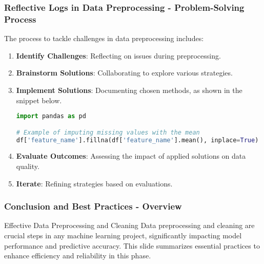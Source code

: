 \documentclass[aspectratio=169]{beamer}
\begin{document}
\begin{frame}[fragile]
    \frametitle{Reflective Logs in Data Preprocessing - Problem-Solving Process}
    
    The process to tackle challenges in data preprocessing includes:
    
    \begin{enumerate}
        \item \textbf{Identify Challenges}: Reflecting on issues during preprocessing.
        \item \textbf{Brainstorm Solutions}: Collaborating to explore various strategies.
        \item \textbf{Implement Solutions}: Documenting chosen methods, as shown in the snippet below.
        
        \begin{lstlisting}[language=Python]
import pandas as pd

# Example of imputing missing values with the mean
df['feature_name'].fillna(df['feature_name'].mean(), inplace=True)
        \end{lstlisting}
        
        \item \textbf{Evaluate Outcomes}: Assessing the impact of applied solutions on data quality.
        \item \textbf{Iterate}: Refining strategies based on evaluations.
    \end{enumerate}
\end{frame}

\begin{frame}[fragile]
    \frametitle{Conclusion and Best Practices - Overview}
    \begin{block}{Effective Data Preprocessing and Cleaning}
        Data preprocessing and cleaning are crucial steps in any machine learning project, significantly impacting model performance and predictive accuracy. This slide summarizes essential practices to enhance efficiency and reliability in this phase.
    \end{block}
\end{frame}
\end{document}
